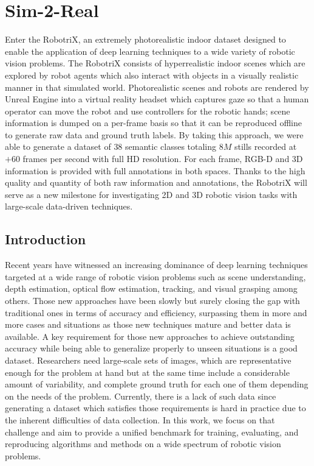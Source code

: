 \chapter{Sim-2-Real}
\label{cha:sim2real}

\begin{chapterabstract}
    Enter the RobotriX, an extremely photorealistic indoor dataset designed to enable the application of deep learning techniques to a wide variety of robotic vision problems. The RobotriX consists of hyperrealistic indoor scenes which are explored by robot agents which also interact with objects in a visually realistic manner in that simulated world. Photorealistic scenes and robots are rendered by Unreal Engine into a virtual reality headset which captures gaze so that a human operator can move the robot and use controllers for the robotic hands; scene information is dumped on a per-frame basis so that it can be reproduced offline to generate raw data and ground truth labels. By taking this approach, we were able to generate a dataset of $38$ semantic classes totaling $8M$ stills recorded at $+60$ frames per second with full HD resolution. For each frame, RGB-D and 3D information is provided with full annotations in both spaces. Thanks to the high quality and quantity of both raw information and annotations, the RobotriX will serve as a new milestone for investigating 2D and 3D robotic vision tasks with large-scale data-driven techniques.
\end{chapterabstract}

\minitoc

\clearpage

\section{Introduction}
\label{cha:sim2real:sec:introduction}

Recent years have witnessed an increasing dominance of deep learning techniques targeted at a wide range of robotic vision problems such as scene understanding, depth estimation, optical flow estimation, tracking, and visual grasping among others. Those new approaches have been slowly but surely closing the gap with traditional ones in terms of accuracy and efficiency, surpassing them in more and more cases and situations as those new techniques mature and better data is available. A key requirement for those new approaches to achieve outstanding accuracy while being able to generalize properly to unseen situations is a good dataset. Researchers need large-scale sets of images, which are representative enough for the problem at hand but at the same time include a considerable amount of variability, and complete ground truth for each one of them depending on the needs of the problem. Currently, there is a lack of such data since generating a dataset which satisfies those requirements is hard in practice due to the inherent difficulties of data collection. In this work, we focus on that challenge and aim to provide a unified benchmark for training, evaluating, and reproducing algorithms and methods on a wide spectrum of robotic vision problems.


